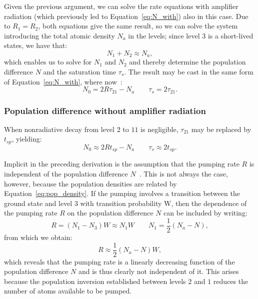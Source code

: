 \documentclass[prl,twocolumn]{revtex4-1}
\begin{document}
Given the previous argument, we can solve the rate equations with amplifier radiation (which previously led to Equation~\eqref{eq:N_with}) also in this case. Due to $R_1=R_2$, both equations give the same result, so we can solve the system introducing the total atomic density $N_a$ in the levels; since level 3 is a short-lived states, we have that:
%
\begin{equation}
\label{eq:pop_density}
N_1 + N_2 \approx N_a,
\end{equation}
%
which enables us to solve for $N_1$ and $N_2$ and thereby determine the population difference $N$ and the saturation time $\tau_s$. The result may be cast in the same form of Equation~\eqref{eq:N_with}, where now~\cite{Saleh2007}:
%
\begin{equation}
N_0 = 2R \tau_{21} - N_a \quad \quad \tau_s = 2\tau_{21}.
\end{equation}

\subsubsection{\textbf{Population difference without amplifier radiation}}

When nonradiative decay from level $2$ to $11$ is negligible, $\tau_{21}$ may be replaced by $t_{sp}$, yielding:
%
\begin{equation}
\label{eq:results_three}
N_0 \approx 2R t_{sp} - N_a \quad \quad \tau_s \approx 2t_{sp}.
\end{equation}

Implicit in the preceding derivation is the assumption that the pumping rate $R$ is independent of the population difference $N$~\cite{Saleh2007}. This is not always the case, however, because the population densities are related by Equation~\eqref{eq:pop_density}. If the pumping involves a transition between the ground state and level $3$ with transition probability W, then the dependence of the pumping rate $R$ on the population difference $N$ can be included by writing:
%
\begin{equation}
R = (N_1 - N_3) W \approx N_1W \quad \quad N_1 = \frac{1}{2} (N_a - N),
\end{equation}
%
from which we obtain:
%
\begin{equation}
R \approx \frac{1}{2} (N_a - N) W,
\end{equation}
%
which reveals that the pumping rate is a linearly decreasing function of the population difference $N$ and is thus clearly not independent of it. This arises because the population inversion established between levels $2$ and $1$ reduces the number of atoms available to be pumped.
\end{document}

